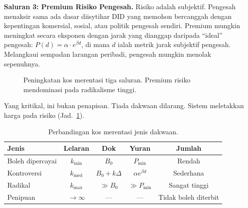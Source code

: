 \documentclass[11pt,a4paper,twocolumn]{article}
\begin{document}
\textbf{Saluran 3: Premium Risiko Pengesah.} Risiko adalah subjektif. Pengesah menaksir sama ada dasar diisytihar DID yang memohon bercanggah dengan kepentingan komersial, sosial, atau politik pengesah sendiri. Premium mungkin meningkat secara eksponen dengan jarak yang dianggap daripada ``ideal'' pengesah: $P(d) = \alpha \cdot e^{\beta d}$, di mana $d$ ialah metrik jarak subjektif pengesah. Melangkaui sempadan larangan peribadi, pengesah mungkin menolak sepenuhnya.

\begin{figure}[ht]
\centering
{}
\caption{Peningkatan kos merentasi tiga saluran. Premium risiko mendominasi pada radikalisme tinggi.}
\label{fig:radicalism}
\end{figure}

Yang kritikal, ini bukan penapisan. Tiada dakwaan dilarang. Sistem meletakkan harga pada risiko (Jad.~\ref{tab:costs}).

\begin{table}[ht]
\centering
\caption{Perbandingan kos merentasi jenis dakwaan.}
\label{tab:costs}
\footnotesize
\begin{tabular}{@{}lcccc@{}}
\toprule
\textbf{Jenis} & \textbf{Lelaran} & \textbf{Dok} & \textbf{Yuran} & \textbf{Jumlah} \\
\midrule
Boleh dipercayai & $k_{\min}$ & $B_0$ & $P_{\min}$ & Rendah \\
Kontroversi & $k_{\text{med}}$ & $B_0{+}k\Delta$ & $\alpha e^{\beta d}$ & Sederhana \\
Radikal & $k_{\max}$ & $\gg B_0$ & $\gg P_{\min}$ & Sangat tinggi \\
Penipuan & $\to\infty$ & --- & --- & Tidak boleh diterbit \\
\bottomrule
\end{tabular}
\end{table}
\end{document}
